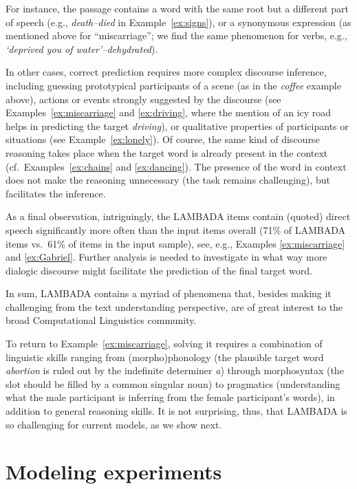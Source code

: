 For instance, the passage contains a word with the same root but a different part of speech (e.g., {\em death--died} in
Example~\ref{ex:signs}), or a synonymous expression (as mentioned above for ``miscarriage''; we find the same phenomenon for verbs, e.g., {\em `deprived you of water'--dehydrated}).

In other cases, correct prediction requires more complex discourse inference, including guessing prototypical participants of a scene (as in the \emph{coffee} example above), actions or events strongly suggested by the discourse (see Examples~\ref{ex:miscarriage}
and \ref{ex:driving}, where the mention of an icy road helps in predicting the target {\em driving}), or qualitative properties of participants or situations (see Example~\ref{ex:lonely}). Of course, the same kind of discourse reasoning takes place when the target word is already present in the context (cf.~Examples~\ref{ex:chains} and \ref{ex:dancing}). The presence of the word in context does not make the reasoning unnecessary (the task remains challenging), but facilitates the inference.

As a final observation, intriguingly, the LAMBADA items contain (quoted) direct speech significantly more often than the input items overall (71\% of LAMBADA items vs.~61\% of items in the input sample), see, e.g., Examples \ref{ex:miscarriage} and \ref{ex:Gabriel}. Further analysis is needed to investigate in what way more dialogic discourse might facilitate the prediction of the final target word.

In sum, LAMBADA contains a myriad of phenomena that, besides making it challenging from the text understanding perspective, are of great interest to the broad Computational Linguistics community. 

To return to Example~\ref{ex:miscarriage}, solving it requires a combination of linguistic skills ranging from (morpho)phonology (the plausible target word \emph{abortion} is ruled out by the indefinite determiner
\emph{a}) through morphosyntax (the slot should be filled by a common singular noun) to pragmatics (understanding what the male participant is inferring from the female participant's words), in addition to general reasoning skills. It is not surprising, thus, that LAMBADA is so challenging for current models, as we show next.

\section{Modeling experiments}
\label{sec:baseline-methods}


